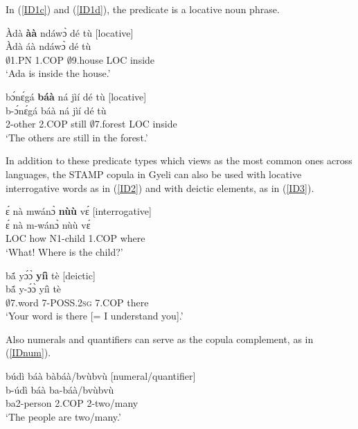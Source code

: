 \noindent  In (\ref{ID1c}) and (\ref{ID1d}), the predicate is a locative noun phrase.

\begin{exe}
\ex\label{ID1c}
  \glll Àdà {\bfseries àà} ndáwɔ̀ dé tù \hfill [locative]\\
        Àdà áà ndáwɔ̀ dé tù  \\
          $\emptyset$1.PN 1.COP $\emptyset$9.house LOC inside  \\
    \trans `Ada is inside the house.'
\end{exe}


\begin{exe} 
\ex\label{ID1d}
  \glll  bɔ́nɛ́gá {\bfseries báà} ná jìí dé tù \hfill [locative]\\
        b-ɔ́nɛ́gá báà ná jìí dé tù \\
          2-other 2.COP still $\emptyset$7.forest LOC inside  \\
    \trans `The others are still in the forest.'
\end{exe}


\noindent In addition to these predicate types which \citet{dryer2007a} views as the most common ones across languages, the STAMP copula in Gyeli can also be used with locative interrogative words as in (\ref{ID2}) and with deictic elements, as in (\ref{ID3}).

\begin{exe} 
\ex\label{ID2}
  \glll ɛ́ nà mwánɔ̀ {\bfseries nùù} vɛ́ \hfill [interrogative]\\
       ɛ́ nà m-wánɔ̀ nùù vɛ́ \\
       LOC how N1-child 1.COP where  \\
    \trans `What! Where is the child?'
\end{exe}


\begin{exe} 
\ex\label{ID3}
  \glll bã́ yɔ́ɔ̀ {\bfseries yíì} tè \hfill [deictic]\\
        bã́ y-ɔ́ɔ̀ yíì tè \\
         $\emptyset$7.word 7-POSS.2\textsc{sg}  7.COP there \\
    \trans `Your word is there [= I understand you].'
\end{exe}

Also numerals and quantifiers can serve as the copula complement, as in (\ref{IDnum}).

\begin{exe} 
\ex\label{IDnum}
  \glll   búdì báà bàbáà/bvùbvù \hfill [numeral/quantifier] \\
         b-údì báà ba-báà/bvùbvù \\
            ba2-person 2.COP 2-two/many \\
    \trans `The people are two/many.'
\end{exe}



